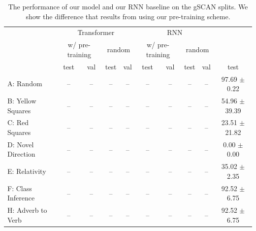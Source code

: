 \documentclass[11pt]{article}
\begin{document}
\begin{table}
\begin{center}
\begin{tabularx}{\textwidth}{ l|ccccccccc }
\toprule
\multicolumn{1}{c}{} 
& \multicolumn{4}{c}{Transformer}  
& \multicolumn{4}{c}{RNN}  
& \\
\cmidrule{3-4}
\cmidrule{7-8}
\multicolumn{1}{c}{} 
& \multicolumn{2}{c}{w/ pre-training}  
& \multicolumn{2}{c}{random}
& \multicolumn{2}{c}{w/ pre-training}  
& \multicolumn{2}{c}{random}
& \multicolumn{1}{c}{\cite{ruis2020benchmark}}\\
& test  & val  & test &  val & test &  val & test & val & test  \\
\midrule
A: Random & --  & --  & -- &  -- & -- &  -- & -- &  -- & 97.69 $\pm$ 0.22\\
B: Yellow Squares & --  & --  & -- &  -- & -- &  -- & -- &  -- &  54.96 $\pm$ 39.39\\
C: Red Squares & --  & --  & -- &  -- & -- &  -- & -- &  -- & 23.51 $\pm$ 21.82\\
D: Novel Direction & --  & --  & -- & -- & -- &  -- & -- &  -- & 0.00 $\pm$ 0.00 \\
E: Relativity & --  & --  & -- & -- & -- &  -- & -- &  -- & 35.02 $\pm$ 2.35 \\
F: Class Inference & --  & --  & -- &  -- &-- &  -- & -- &  -- &  92.52 $\pm$ 6.75 \\
H: Adverb to Verb & --  & --  & -- &  -- &-- &  -- & -- &  -- &  92.52 $\pm$ 6.75 \\
\bottomrule
\end{tabularx}
\end{center}
\caption{The performance of our model and our RNN baseline on the gSCAN splits. We show the difference that results from using our pre-training scheme.}
\label{tab:gscan_results}
\end{table}
\end{document}
